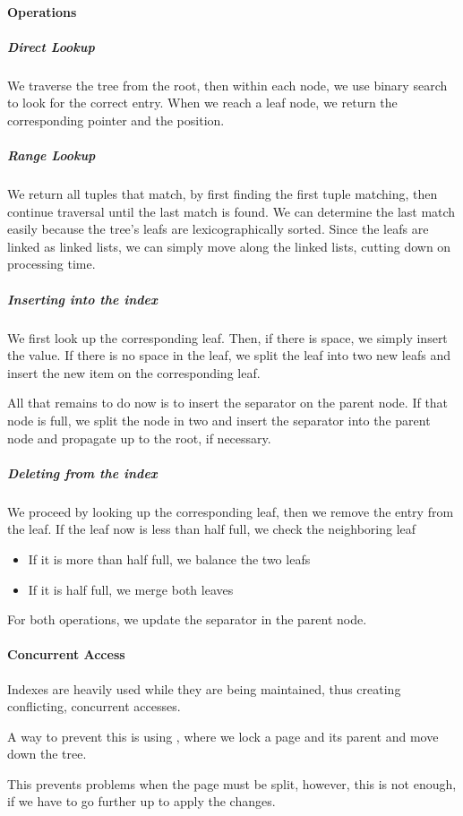 \paragraph{Operations}
\subparagraph{Direct Lookup}
We traverse the tree from the root, then within each node, we use binary search to look for the correct entry.
When we reach a leaf node, we return the corresponding pointer and the position.


\subparagraph{Range Lookup}
We return all tuples that match, by first finding the first tuple matching, then continue traversal until the last match is found.
We can determine the last match easily because the tree's leafs are lexicographically sorted.
Since the leafs are linked as linked lists, we can simply move along the linked lists, cutting down on processing time.


\subparagraph{Inserting into the index}
We first look up the corresponding leaf. Then, if there is space, we simply insert the value.
If there is no space in the leaf, we split the leaf into two new leafs and insert the new item on the corresponding leaf.

All that remains to do now is to insert the separator on the parent node.
If that node is full, we split the node in two and insert the separator into the parent node and propagate up to the root, if necessary.


\subparagraph{Deleting from the index}
We proceed by looking up the corresponding leaf, then we remove the entry from the leaf.
If the leaf now is less than half full, we check the neighboring leaf
\begin{itemize}
    \item If it is more than half full, we balance the two leafs
    \item If it is half full, we merge both leaves
\end{itemize}
For both operations, we update the separator in the parent node.


\paragraph{Concurrent Access}
Indexes are heavily used while they are being maintained, thus creating conflicting, concurrent accesses.

A way to prevent this is using , where we lock a page and its parent and move down the tree.

This prevents problems when the page must be split, however, this is not enough, if we have to go further up to apply the changes.

